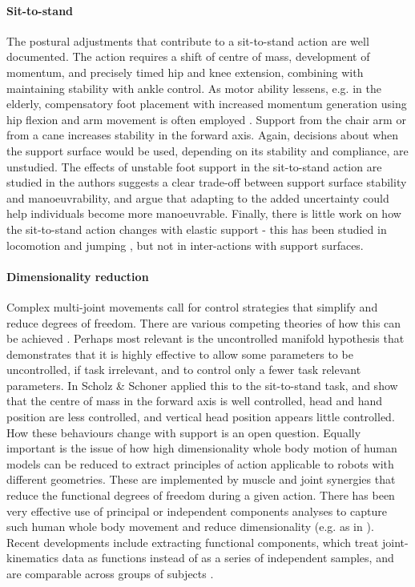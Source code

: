 \documentclass[final,5p,twocolumn]{elsarticle}
\begin{document}
\paragraph{Sit-to-stand} The postural adjustments that contribute to a sit-to-stand action are well documented. The action requires a shift of centre of mass, development of momentum, and precisely timed hip and knee extension, combining with maintaining stability with ankle control. As motor ability lessens, e.g. in the elderly, compensatory foot placement with increased momentum generation using hip flexion and arm movement is often employed \cite{Janssen2002}. Support from the chair arm or from a cane \cite{Leung2009}  increases stability in the forward axis. Again, decisions about when the support surface would be used, depending on its stability and compliance, are unstudied. The effects of unstable foot support in the sit-to-stand action are studied in \cite{Huang2011} the authors suggests a clear trade-off between support surface stability and manoeuvrability, and argue that adapting to the added uncertainty could help individuals become more manoeuvrable. Finally, there is little work on how the sit-to-stand action changes with elastic support - this has been studied in locomotion and jumping \cite{Arampatzis2001}, but not in inter-actions with support surfaces.

\paragraph{Dimensionality reduction}
Complex multi-joint movements call for control strategies that simplify and reduce degrees of freedom. There are various competing theories of how this can be achieved \cite{Latash2010}. Perhaps most relevant is the uncontrolled manifold hypothesis \cite{Scholz1999} that demonstrates that it is highly effective to allow some parameters to be uncontrolled, if task irrelevant, and to control only a fewer task relevant parameters. In \cite{Scholz1999} Scholz \& Schoner applied this to the sit-to-stand task, and show that the centre of mass in the forward axis is well controlled, head and hand position are less controlled, and vertical head position appears little controlled. How these behaviours change with support is an open question. Equally important is the issue of how high dimensionality whole body motion of human models can be reduced to extract principles of action applicable to robots with different geometries. These are implemented by muscle and joint synergies that reduce the functional degrees of freedom during a given action. There has been very effective use of principal or independent components analyses to capture such human whole body movement and reduce dimensionality (e.g. as in \cite{Forner-Cordero2005} ). Recent developments include extracting functional components, which treat joint-kinematics data as functions instead of as a series of independent samples, and are comparable across groups of subjects \cite{Coffey2011}.
\end{document}
